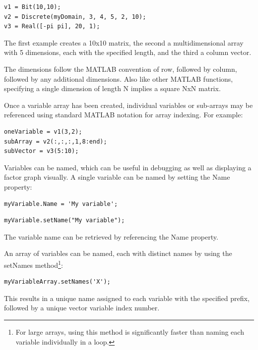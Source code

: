 \begin{lstlisting}
v1 = Bit(10,10);
v2 = Discrete(myDomain, 3, 4, 5, 2, 10);
v3 = Real([-pi pi], 20, 1);
\end{lstlisting}

The first example creates a 10x10 matrix, the second a multidimensional array with 5 dimensions, each with the specified length, and the third a column vector.

The dimensions follow the MATLAB convention of row, followed by column, followed by any additional dimensions.  Also like other MATLAB functions, specifying a single dimension of length N implies a square NxN matrix.

Once a variable array has been created, individual variables or sub-arrays may be referenced using standard MATLAB notation for array indexing.  For example:

\begin{lstlisting}
oneVariable = v1(3,2);
subArray = v2(:,:,:,1,8:end);
subVector = v3(5:10);
\end{lstlisting}

\fi


Variables can be named, which can be useful in debugging as well as displaying a factor graph visually.  A single variable can be named by setting the Name property:

\ifmatlab
\begin{lstlisting}
myVariable.Name = 'My variable';
\end{lstlisting}
\fi

\ifjava
\begin{lstlisting}
myVariable.setName("My variable");
\end{lstlisting}

\fi

The variable name can be retrieved by referencing the Name property.

\ifmatlab

An array of variables can be named, each with distinct names by using the setNames method\footnote{For large arrays, using this method is significantly faster than naming each variable individually in a loop.}:

\begin{lstlisting}
myVariableArray.setNames('X');
\end{lstlisting}

This results in a unique name assigned to each variable with the specified prefix, followed by a unique vector variable index number.

